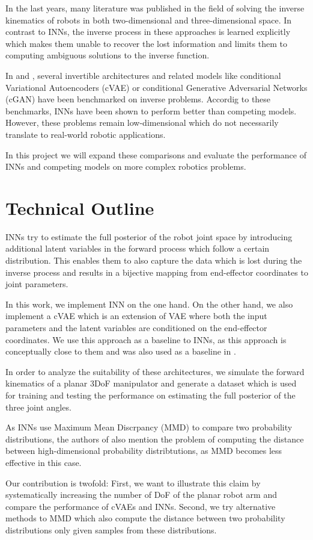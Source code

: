 \documentclass[conference]{IEEEtran}
\begin{document}
In the last years, many literature was published in the field of solving the inverse kinematics of robots in both two-dimensional \cite{Duka2014} and three-dimensional space. 
In contrast to INNs, the inverse process in these approaches is learned explicitly which makes them unable to recover the lost information and limits them to computing ambiguous solutions to the inverse function.

In \cite{Kruse2019} and \cite{Ardizzone2018}, several invertible architectures and related models like conditional Variational Autoencoders (cVAE) \cite{Sohn2015} or conditional Generative Adversarial Networks (cGAN) \cite{Mehdi2018} have been benchmarked on inverse problems. 
Accordig to these benchmarks, INNs have been shown to perform better than competing models. However, these problems remain low-dimensional which do not necessarily translate to real-world robotic applications.

In this project we will expand these comparisons and evaluate the performance of INNs and competing models on more complex robotics problems.

\section*{Technical Outline}

INNs try to estimate the full posterior of the robot joint space by introducing additional latent variables in the forward process which follow a certain distribution. This enables them to also capture the data which is lost during the inverse process and results in a bijective mapping from end-effector coordinates to joint parameters.

In this work, we implement INN on the one hand. On the other hand, we also implement a cVAE \cite{Sohn2015} which is an extension of VAE where both the input parameters and the latent variables are conditioned on the end-effector coordinates. We use this approach as a baseline to INNs, as this approach is conceptually close to them and was also used as a baseline in \cite{Ardizzone2018}.

In order to analyze the suitability of these architectures, we simulate the forward kinematics of a planar 3DoF manipulator and generate a dataset which is used for training and testing the performance on estimating the full posterior of the three joint angles.

As INNs use Maximum Mean Discrpancy (MMD) \cite{Gretton2008} to compare two probability distributions, the authors of \cite{Ardizzone2018} also mention the problem of computing the distance between high-dimensional probability distribtutions, as MMD becomes less effective in this case.

Our contribution is twofold: First, we want to illustrate this claim by systematically increasing the number of DoF of the planar robot arm and compare the performance of cVAEs and INNs. Second, we try alternative methods to MMD which also compute the distance between two probability distributions only given samples from these distributions.



\end{document}
